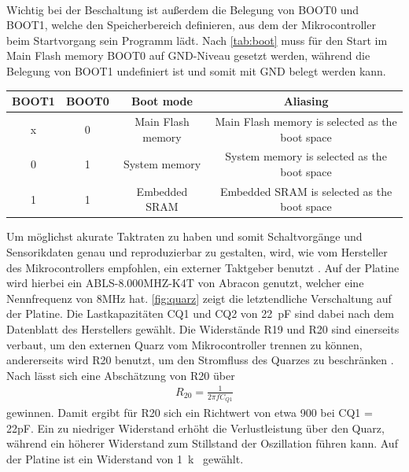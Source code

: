 \noindent\begin{minipage}{0.75\textwidth}
\label{fig:mcupin}
\end{minipage}
\noindent\begin{minipage}{0.2\textwidth}
	\label{tab:pins}
\end{minipage}
\hspace{1cm}
\newline
\\
Wichtig bei der Beschaltung ist außerdem die Belegung von BOOT0 und BOOT1, welche den Speicherbereich definieren, aus dem der Mikrocontroller beim Startvorgang sein Programm lädt. Nach \autoref{tab:boot} muss für den Start im Main Flash memory BOOT0 auf GND-Niveau gesetzt werden, während die Belegung von BOOT1 undefiniert ist und somit mit GND belegt werden kann.

\begin{table}[H]%
\centering
{}
\begin{tabular}{c c c c}
BOOT1 & BOOT0 & Boot mode & Aliasing \\ \hline
x & 0 & Main Flash memory & Main Flash memory is selected as the boot space\\
0 & 1 & System memory & System memory is selected as the boot space\\
1 & 1 & Embedded SRAM & Embedded SRAM is selected as the boot space
\end{tabular}

\label{tab:boot}
\end{table}\noindent
Um möglichst akurate Taktraten zu haben und somit Schaltvorgänge und Sensorikdaten genau und reproduzierbar zu gestalten, wird, wie vom Hersteller des Mikrocontrollers empfohlen, ein externer Taktgeber benutzt \cite[S.218]{stmref}. Auf der Platine wird hierbei ein ABLS-8.000MHZ-K4T von Abracon genutzt, welcher eine Nennfrequenz von 8MHz hat. \autoref{fig:quarz} zeigt die letztendliche Verschaltung auf der Platine. Die Lastkapazitäten CQ1 und CQ2 von \SI{22}{pF} sind dabei nach dem Datenblatt des Herstellers gewählt. Die Widerstände R19 und R20 sind einerseits verbaut, um den externen Quarz vom Mikrocontroller trennen zu können, andererseits wird R20 benutzt, um den Stromfluss des Quarzes zu beschränken \cite[S.16]{stmquarz}. Nach \cite[S.16]{stmquarz} lässt sich eine Abschätzung von R20 über
\begin{align*}
R_{20} = \frac{1}{2\pi f C_{Q1}}
\end{align*}
gewinnen. Damit ergibt für R20 sich ein Richtwert von etwa \SI{900}{\Omega} bei CQ1 = 22pF. Ein zu niedriger Widerstand erhöht die Verlustleistung über den Quarz, während ein höherer Widerstand zum Stillstand der Oszillation führen kann. Auf der Platine ist ein Widerstand von \SI{1}{k\Omega} gewählt.


